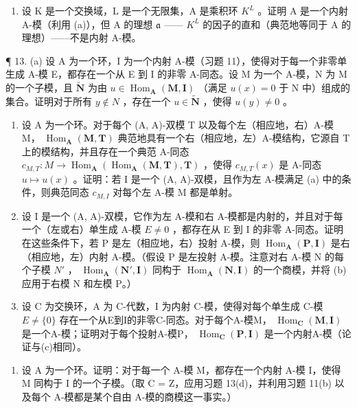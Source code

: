 \begin{enumerate}
\def\labelenumi{(\alph{enumi})}
\setcounter{enumi}{1}
\tightlist
\item
  设 K 是一个交换域，L 是一个无限集，A 是乘积环 \(K^{L}\) 。证明 A 是一个内射 A-模（利用 (a)），但 A 的理想 \(\mathfrak{a}\) —— \(K^{L}\) 的因子的直和（典范地等同于 A 的理想）——不是内射 A-模。
\end{enumerate}

¶ 13. (a) 设 A 为一个环，I 为一个内射 A-模（习题 11），使得对于每一个非零单生成 A-模 E，都存在一个从 E 到 I 的非零 A-同态。设 M 为一个 A-模，N 为 M 的一个子模，且 \(\tilde{\mathbf{N}}\) 为由 \(u \in \operatorname{Hom}_{\mathbf{A}}(\mathbf{M}, \mathbf{I})\) （满足 \(u(x) = 0\) 于 N 中）组成的集合。证明对于所有 \(y \notin N\) ，存在一个 \(u \in \tilde{\mathbf{N}}\) ，使得 \(u(y) \neq 0\) 。

\begin{enumerate}
\def\labelenumi{(\alph{enumi})}
\setcounter{enumi}{1}
\item
  设 A 为一个环。对于每个 (A, A)-双模 T 以及每个左（相应地，右）A-模 M， \(\operatorname{Hom}_{\mathbf{A}}(\mathbf{M}, \mathbf{T})\) 典范地具有一个右（相应地，左）A-模结构，它源自 T 上的模结构，并且存在一个典范 A-同态 \(c_{M,T}: M \to \operatorname{Hom}_{\mathbf{A}}(\operatorname{Hom}_{\mathbf{A}}(\mathbf{M}, \mathbf{T}), \mathbf{T})\) ，使得 \(c_{M,T}(x)\) 是 A-同态 \(u \mapsto u(x)\) 。证明：若 I 是一个 (A, A)-双模，且作为左 A-模满足 (a) 中的条件，则典范同态 \(c_{M,I}\) 对每个左 A-模 M 都是单射。
\item
  设 I 是一个 (A, A)-双模，它作为左 A-模和右 A-模都是内射的，并且对于每一个（左或右）单生成 A-模 \(E \neq 0\) ，都存在从 E 到 I 的非零 A-同态。证明在这些条件下，若 P 是左（相应地，右）投射 A-模，则 \(\operatorname{Hom}_{\mathbf{A}}(\mathbf{P}, \mathbf{I})\) 是右（相应地，左）内射 A-模。（假设 P 是左投射 A-模。注意对右 A-模 N 的每个子模 \(N'\) ， \(\operatorname{Hom}_{\mathbf{A}}(\mathbf{N}', \mathbf{I})\) 同构于 \(\operatorname{Hom}_{\mathbf{A}}(\mathbf{N}, \mathbf{I})\) 的一个商模，并将 (b) 应用于右模 N 和左模 P。）
\item
  设 C 为交换环，A 为 C-代数，I 为内射 C-模，使得对每个单生成 C-模 \(E \neq \{0\}\) 存在一个从E到I的非零C-同态。对于每个A-模M， \(\operatorname{Hom}_{\mathbf{C}}(\mathbf{M}, \mathbf{I})\) 是一个A-模；证明对于每个投射A-模P， \(\operatorname{Hom}_{\mathbf{C}}(\mathbf{P}, \mathbf{I})\) 是一个内射A-模（论证与(c)相同）。
\end{enumerate}

\begin{enumerate}
\def\labelenumi{\arabic{enumi}.}
\setcounter{enumi}{13}
\tightlist
\item
  设 A 为一个环。证明：对于每一个 A-模 M，都存在一个内射 A-模 I，使得 M 同构于 I 的一个子模。（取 C = Z，应用习题 13(d)，并利用习题 11(b) 以及每个 A-模都是某个自由 A-模的商模这一事实。）
\end{enumerate}

